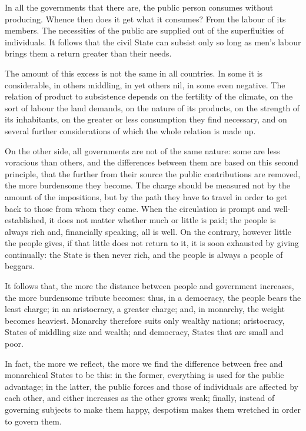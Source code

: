 \documentclass[12pt]{book}
\begin{document}
In all the governments that there are, the public person consumes without producing. Whence then does it get what it consumes? From the labour of its members. The necessities of the public are supplied out of the superfluities of individuals. It follows that the civil State can subsist only so long as men's labour brings them a return greater than their needs.

The amount of this excess is not the same in all countries. In some it is considerable, in others middling, in yet others nil, in some even negative. The relation of product to subsistence depends on the fertility of the climate, on the sort of labour the land demands, on the nature of its products, on the strength of its inhabitants, on the greater or less consumption they find necessary, and on several further considerations of which the whole relation is made up.

On the other side, all governments are not of the same nature: some are less voracious than others, and the differences between them are based on this second principle, that the further from their source the public contributions are removed, the more burdensome they become. The charge should be measured not by the amount of the impositions, but by the path they have to travel in order to get back to those from whom they came. When the circulation is prompt and well-established, it does not matter whether much or little is paid; the people is always rich and, financially speaking, all is well. On the contrary, however little the people gives, if that little does not return to it, it is soon exhausted by giving continually: the State is then never rich, and the people is always a people of beggars.

It follows that, the more the distance between people and government increases, the more burdensome tribute becomes: thus, in a democracy, the people bears the least charge; in an aristocracy, a greater charge; and, in monarchy, the weight becomes heaviest. Monarchy therefore suits only wealthy nations; aristocracy, States of middling size and wealth; and democracy, States that are small and poor.

In fact, the more we reflect, the more we find the difference between free and monarchical States to be this: in the former, everything is used for the public advantage; in the latter, the public forces and those of individuals are affected by each other, and either increases as the other grows weak; finally, instead of governing subjects to make them happy, despotism makes them wretched in order to govern them.
\end{document}
